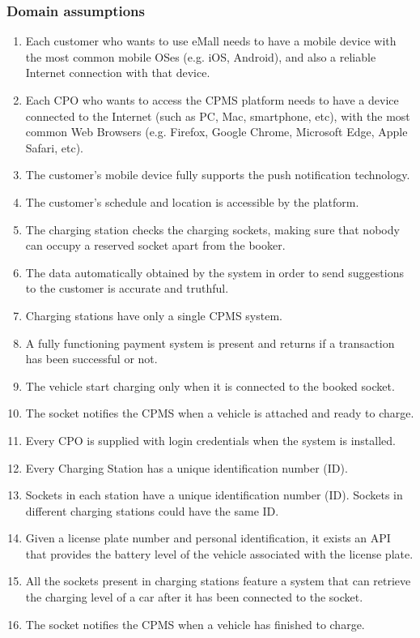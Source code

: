 \subsubsection{Domain assumptions}
\begin{enumerate}[label=\textbf{D\arabic*}:]
    \item Each customer who wants to use eMall needs to have a mobile device with the most common mobile OSes (e.g. iOS, Android), and also a reliable Internet connection with that device.
    \item Each CPO who wants to access the CPMS platform needs to have a device connected to the Internet (such as PC, Mac, smartphone, etc), with the most common Web Browsers (e.g. Firefox, Google Chrome, Microsoft Edge, Apple Safari, etc).  
    \item The customer's mobile device fully supports the push notification technology.
    \item The customer's schedule and location is accessible by the platform.
    \item The charging station checks the charging sockets, making sure that nobody can occupy a reserved socket apart from the booker.
    \item The data automatically obtained by the system in order to send suggestions to the customer is accurate and truthful.
    \item Charging stations have only a single CPMS system.
    \item A fully functioning payment system is present and returns if a transaction has been successful or not.
    \item The vehicle start charging only when it is connected to the booked socket.
    \item The socket notifies the CPMS when a vehicle is attached and ready to charge.
    \item Every CPO is supplied with login credentials when the system is installed.
    \item Every Charging Station has a unique identification number (ID).
    \item Sockets in each station have a unique identification number (ID). Sockets in different charging stations could have the same ID.
    \item Given a license plate number and personal identification, it exists an API that provides the battery level of the vehicle associated with the license plate.
    \item All the sockets present in charging stations feature a system that can retrieve the charging level of a car after it has been connected to the socket.
    \item The socket notifies the CPMS when a vehicle has finished to charge.
\end{enumerate}
